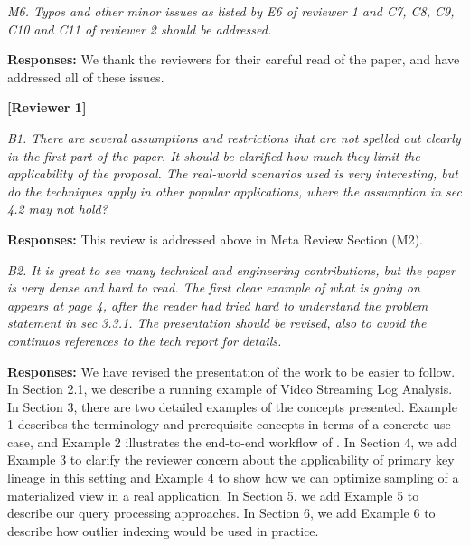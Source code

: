\vspace{1em}
\emph{M6. Typos and other minor issues as listed by E6 of reviewer 1 and C7, C8, C9, C10 and C11 of reviewer 2 should be addressed.}

\vspace{.25em}

{\bf Responses:} We thank the reviewers for their careful read of the paper, and have addressed all of these issues.

\vspace{2em}
\noindent\textbf{[Reviewer 1]}
\vspace{1em}

\emph{B1. There are several assumptions and restrictions that are not spelled out clearly in the first part of the paper. It should be clarified how much they limit the applicability of the proposal. The real-world scenarios used is very interesting, but do the techniques apply in other popular applications, where the assumption in sec 4.2 may not hold?}

\vspace{.25em}

{\bf Responses:} This review is addressed above in Meta Review Section (M2).

\vspace{1em}
\emph{B2. It is great to see many technical and engineering contributions, but the paper is very dense and hard to read. The first clear example of what is going on appears at page 4, after the reader had tried hard to understand the problem statement in sec 3.3.1. The presentation should be revised, also to avoid the continuos references to the tech report for details.}

\vspace{.25em}

{\bf Responses:} We have revised the presentation of the work to be easier to follow. In Section 2.1, we describe a running example of Video Streaming Log Analysis. In Section 3, there are two detailed examples of the concepts presented. Example 1 describes the terminology and prerequisite concepts in terms of a concrete use case, and Example 2 illustrates the end-to-end workflow of \svc. In Section 4, we add Example 3 to clarify the reviewer concern about the applicability of primary key lineage in this setting and Example 4 to show how we can optimize sampling of a materialized view in a real application. In Section 5, we add Example 5 to describe our query processing approaches. In Section 6, we add Example 6 to describe how outlier indexing would be used in practice. 

